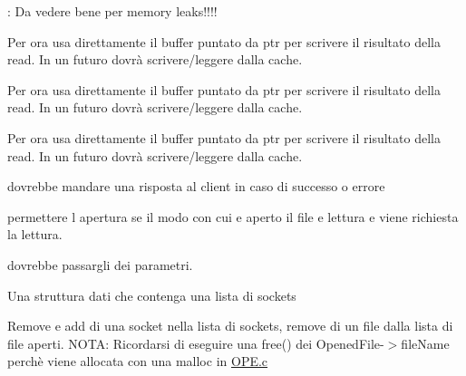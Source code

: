 
\begin{DoxyRefList}
\item[\label{todo__todo000004}%
\hypertarget{todo__todo000004}{}%
global\+Scope$>$ Globale \hyperlink{OPE_8c_a6eccb6ec6ec9c8375e70ab4088b511a5}{handle\+Open\+Command} (char $\ast$command, int socket)]\+: Da vedere bene per memory leaks!!!!  
\item[\label{todo__todo000001}%
\hypertarget{todo__todo000001}{}%
global\+Scope$>$ Globale \hyperlink{Client_2READ_8c_aa4b63039ca9686f5666ce6bbb33317d7}{mydfs\+\_\+read} (\hyperlink{structMyDFSId}{My\+D\+F\+S\+Id} $\ast$id, int pos, void $\ast$ptr, unsigned int size)]Per ora usa direttamente il buffer puntato da ptr per scrivere il risultato della read. In un futuro dovrà scrivere/leggere dalla cache. 
\item[\label{todo__todo000001}%
\hypertarget{todo__todo000001}{}%
global\+Scope$>$ Globale \hyperlink{Client_2READ_8c_aa4b63039ca9686f5666ce6bbb33317d7}{mydfs\+\_\+read} (\hyperlink{structMyDFSId}{My\+D\+F\+S\+Id} $\ast$id, int pos, void $\ast$ptr, unsigned int size)]Per ora usa direttamente il buffer puntato da ptr per scrivere il risultato della read. In un futuro dovrà scrivere/leggere dalla cache. 
\item[\label{todo__todo000001}%
\hypertarget{todo__todo000001}{}%
global\+Scope$>$ Globale \hyperlink{Client_2READ_8c_aa4b63039ca9686f5666ce6bbb33317d7}{mydfs\+\_\+read} (\hyperlink{structMyDFSId}{My\+D\+F\+S\+Id} $\ast$id, int pos, void $\ast$ptr, unsigned int size)]Per ora usa direttamente il buffer puntato da ptr per scrivere il risultato della read. In un futuro dovrà scrivere/leggere dalla cache. 
\item[\label{todo__todo000003}%
\hypertarget{todo__todo000003}{}%
File \hyperlink{OPE_8c}{O\+P\+E.c} ]dovrebbe mandare una risposta al client in caso di successo o errore 

permettere l\textquotesingle{} apertura se il modo con cui e\textquotesingle{} aperto il file e\textquotesingle{} lettura e viene richiesta la lettura.  
\item[\label{todo__todo000005}%
\hypertarget{todo__todo000005}{}%
global\+Scope$>$ Globale \hyperlink{server_8c_a5e7b14672f9e2c9fa99b363004afb8e8}{spawn\+Thread} ()]dovrebbe passargli dei parametri.  
\item[\label{todo__todo000006}%
\hypertarget{todo__todo000006}{}%
File \hyperlink{StruttureDati_8c}{Strutture\+Dati.c} ]Una struttura dati che contenga una lista di sockets 

Remove e add di una socket nella lista di sockets, remove di un file dalla lista di file aperti. N\+O\+T\+A\+: Ricordarsi di eseguire una free() dei Opened\+File-\/$>$file\+Name perchè viene allocata con una malloc in \hyperlink{OPE_8c}{O\+P\+E.\+c}
\end{DoxyRefList}